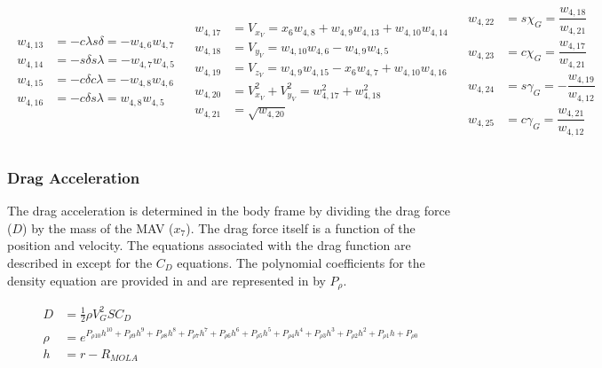 \begin{align} \label{eq:auxVV}
\begin{split}
w_{4,13} &= -c\lambda s\delta  = -w_{4,6}w_{4,7} \\
w_{4,14} &= -s\delta s\lambda = -w_{4,7}w_{4,5} \\
w_{4,15} &= -c\delta c\lambda = -w_{4,8}w_{4,6} \\
w_{4,16} &= -c\delta s\lambda = w_{4,8}w_{4,5} \\
\end{split}
&
\begin{split}
w_{4,17} &= V_{x_{V}} = x_{6}w_{4,8}+w_{4,9}w_{4,13}+w_{4,10}w_{4,14} \\
w_{4,18} &= V_{y_{V}} = w_{4,10}w_{4,6}-w_{4,9}w_{4,5} \\
w_{4,19} &= V_{z_{V}} = w_{4,9}w_{4,15}-x_{6}w_{4,7}+w_{4,10}w_{4,16} \\
w_{4,20} &= V_{x_{V}}^{2}+V_{y_{V}}^{2} = w_{4,17}^{2}+w_{4,18}^{2} \\
w_{4,21} &= \sqrt{w_{4,20}} \\
\end{split}
&
\begin{split}
w_{4,22} &= s\chi_{G} = \dfrac{w_{4,18}}{w_{4,21}} \\
w_{4,23} &= c\chi_{G} = \dfrac{w_{4,17}}{w_{4,21}} \\
w_{4,24} &= s\gamma_{G} = -\dfrac{w_{4,19}}{w_{4,12}} \\
w_{4,25} &= c\gamma_{G} = \dfrac{w_{4,21}}{w_{4,12}} \\
\end{split}
\end{align}



\subsubsection{Drag Acceleration}
\label{subsubsec:tsiDrag}
The drag acceleration is determined in the body frame by dividing the drag force ($D$) by the mass of the \ac{MAV} ($x_{7}$). The drag force itself is a function of the position and velocity. The equations associated with the drag function are described in  except for the $C_{D}$ equations. The polynomial coefficients for the density equation are provided in  and are represented in  by $P_{\rho}$.

 \begin{equation} \label{eq:drag}
\begin{split}
D &= \frac{1}{2}\rho V_{G}^{2}SC_{D}\\
\rho &= e^{P_{\rho 10}h^{10}+P_{\rho 9}h^{9}+P_{\rho 8}h^{8}+P_{\rho 7}h^{7}+P_{\rho 6}h^{6}+P_{\rho 5}h^{5}+P_{\rho 4}h^{4}+P_{\rho 3}h^{3}+P_{\rho 2}h^{2}+P_{\rho 1}h+P_{\rho 0}} \\
h &= r-R_{MOLA} \\
\end{split}
\end{equation}

